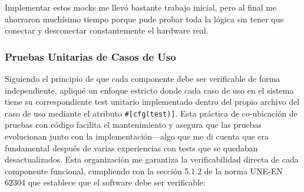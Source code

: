 Implementar estos mocks me llevó bastante trabajo inicial, pero al final me ahorraron muchísimo tiempo porque pude probar toda la lógica sin tener que conectar y desconectar constantemente el hardware real.

\newpage
\subsubsection{Pruebas Unitarias de Casos de Uso}

Siguiendo el principio de que cada componente debe ser verificable de forma independiente, apliqué un enfoque estricto donde cada caso de uso en el sistema tiene su correspondiente test unitario implementado dentro del propio archivo del caso de uso mediante el atributo \texttt{\#[cfg(test)]}. Esta práctica de co-ubicación de pruebas con código facilita el mantenimiento y asegura que las pruebas evolucionan junto con la implementación—algo que me di cuenta que era fundamental después de varias experiencias con tests que se quedaban desactualizados. Esta organización me garantiza la verificabilidad directa de cada componente funcional, cumpliendo con la sección 5.1.2 de la norma UNE-EN 62304 que establece que el software debe ser verificable:

\begin{table}[ht]
    \centering
    \small
    \caption{Correspondencia entre casos de uso y tests unitarios}
    \label{tab:use_case_tests}
\end{table}

